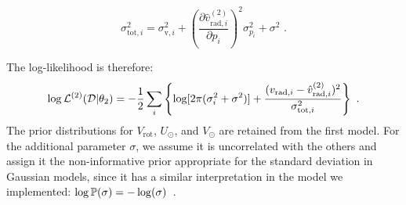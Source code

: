 \begin{equation}\label{eq:ErrorPropagation}
    \sigma^2_{\text{tot}, i} = \sigma^2_{\text{v},i} +  {\left( \frac{\partial \hat{v}^{(2)}_{\text{rad}, i}}{\partial p_i} \right)}^2 \sigma^2_{p_i} + \sigma^2 \text{ .}
\end{equation}


The log-likelihood is therefore:
\begin{equation}\label{Eq:LogLikeMod2}
    \log \mathbb{\mathcal{L}}^{(2)}(\mathcal{D} \vert \theta_2) = -\frac{1}{2}\sum_i\left\{\log[2\pi(\sigma_{i}^2+\sigma^2)]+\frac{(v_{\text{rad},i} - \hat{v}_{\text{rad},i}^{(2)})^2}{\sigma_{\text{tot}, i}^2}\right\} \text{ .}
\end{equation}
\noindent
The prior distributions for $V_{\text{rot}}$, $U_{\odot}$, and $V_{\odot}$ are retained from the first model. For the additional parameter $\sigma$, we assume it is uncorrelated with the others and assign it the non-informative prior appropriate for the standard deviation in Gaussian models, since it has a similar interpretation in the model we implemented: $\log \mathbb{P} (\sigma) = - \log(\sigma)$~\cite{mackay2003}.

